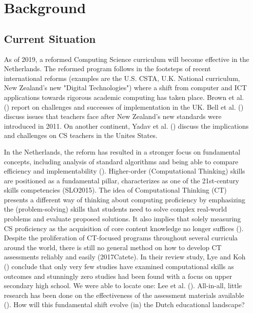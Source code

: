 
\section{Background}\label{sec:background}

\subsection{Current Situation}


As of 2019, a reformed Computing Science curriculum will become effective in the Netherlands. The reformed program follows in the footsteps of recent international reforms (examples are the U.S. CSTA, U.K. National curriculum, New Zealand's new "Digital Technologies") where a shift from computer and ICT applications towards rigorous academic computing has taken place. Brown et al. (\cite{Brown2013}) report on challenges and successes of implementation in the UK. Bell et al. (\cite{Bell2014}) discuss issues that teachers face after New Zealand's new standards were introduced in 2011. On another continent, Yadav et al. (\cite{Yadav2016}) discuss the implications and challenges on CS teachers in the Unites States.

In the Netherlands, the reform has resulted in a stronger focus on fundamental concepts, including analysis of standard algorithms and being able to compare efficiency and implementability (\cite{Barendsen2016}). Higher-order (Computational Thinking) skills are positioned as a fundamental pillar, characterizes as one of the 21st-century skills competencies (SLO2015). The idea of Computational Thinking (CT) presents a different way of thinking about computing proficiency by emphasizing the (problem-solving) skills that students need to solve complex real-world problems and evaluate proposed solutions. It also implies that solely measuring CS proficiency as the acquisition of core content knowledge no longer suffices (\cite{Yadav2015}). Despite the proliferation of CT-focused programs throughout several curricula around the world, there is still no general method on how to develop CT assessments reliably and easily (2017Catete). In their review study, Lye and Koh (\cite{LyeKoh2014}) conclude that only very few studies have examined computational skills as outcomes and stunningly zero studies had been found with a focus on upper secondary high school. We were able to locate one: Lee et al. (\cite{Lee2011}). All-in-all, little research has been done on the effectiveness of the assessment materials available (\cite{Yadav2016}).
How will this fundamental shift evolve (in) the Dutch educational landscape?




